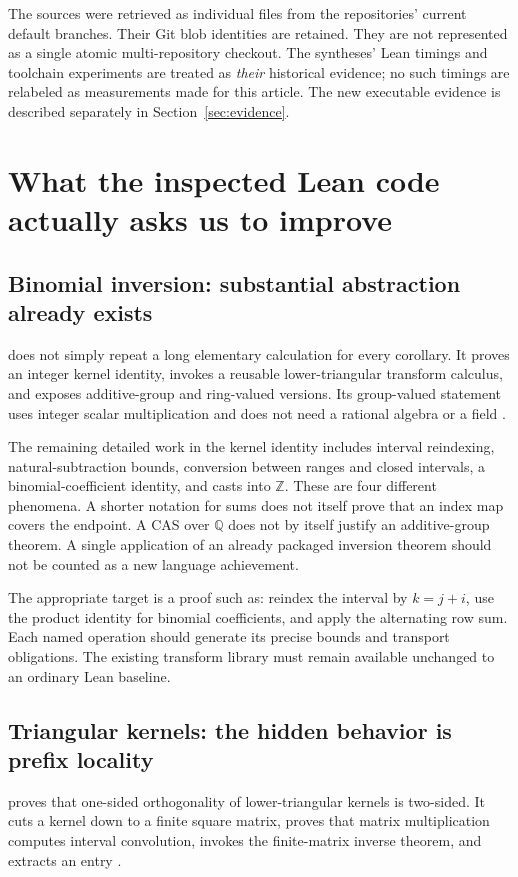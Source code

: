 \documentclass[11pt,a4paper]{article}
\newcommand{\Z}{\mathbb Z}
\newcommand{\Q}{\mathbb Q}
\theoremstyle{plain}
\theoremstyle{definition}
\begin{document}
The sources were retrieved as individual files from the repositories' current default branches. Their Git blob identities are retained. They are not represented as a single atomic multi-repository checkout. The syntheses' Lean timings and toolchain experiments are treated as \emph{their} historical evidence; no such timings are relabeled as measurements made for this article. The new executable evidence is described separately in Section~\ref{sec:evidence}.

\section{What the inspected Lean code actually asks us to improve}\label{sec:corpus}

\subsection{Binomial inversion: substantial abstraction already exists}
 does not simply repeat a long elementary calculation for every corollary. It proves an integer kernel identity, invokes a reusable lower-triangular transform calculus, and exposes additive-group and ring-valued versions. Its group-valued statement uses integer scalar multiplication and does not need a rational algebra or a field \cite{binomial}.

The remaining detailed work in the kernel identity includes interval reindexing, natural-subtraction bounds, conversion between ranges and closed intervals, a binomial-coefficient identity, and casts into $\Z$. These are four different phenomena. A shorter notation for sums does not itself prove that an index map covers the endpoint. A CAS over $\Q$ does not by itself justify an additive-group theorem. A single application of an already packaged inversion theorem should not be counted as a new language achievement.

The appropriate target is a proof such as: reindex the interval by $k=j+i$, use the product identity for binomial coefficients, and apply the alternating row sum. Each named operation should generate its precise bounds and transport obligations. The existing transform library must remain available unchanged to an ordinary Lean baseline.

\subsection{Triangular kernels: the hidden behavior is prefix locality}
 proves that one-sided orthogonality of lower-triangular kernels is two-sided. It cuts a kernel down to a finite square matrix, proves that matrix multiplication computes interval convolution, invokes the finite-matrix inverse theorem, and extracts an entry \cite{triangular}.
\end{document}
